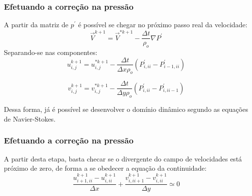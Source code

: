 \documentclass[xcolor=dvipsnames,10pt,aspectratio=169]{beamer}
\begin{document}
	\begin{frame}
		\frametitle{Efetuando a correção na pressão}
		A partir da matriz de $p^\prime$ é possível se chegar no próximo passo real da velocidade:
		\begin{equation}
			\vec{V}^{k+1}  = \vec{V}^{\ast{k + 1}} - \frac{\Delta t}{\rho_o} \nabla P^\prime
		\end{equation}
		Separando-se nas componentes:
		\begin{equation}
			u^{k+1}_{i, j}  = u^{\ast k+1}_{i, j} - \frac{\Delta t}{\Delta x \rho_o} \left(  P^{\prime}_{i , ii} -   P^{\prime}_{i - 1, ii}  \right)
		\end{equation}

		\begin{equation}
		v^{k+1}_{i, j}  = v^{\ast k+1}_{i, j} - \frac{\Delta t}{\Delta y \rho_o}  \left(  P^{\prime}_{i , ii} -   P^{\prime}_{i, ii-1}    \right)
		\end{equation}

		Dessa forma, já é possível se desenvolver o domínio dinâmico segundo as equações de Navier-Stokes.


	\end{frame}




	\begin{frame}
		\frametitle{Efetuando a correção na pressão}
		A partir desta etapa, basta checar se o divergente do campo de velocidades está próximo de zero, de forma a se obedecer a equação da continuidade:
		\begin{equation}
		\frac{u_{i + 1 , ii}^{k + 1} - u_{i, ii}^{k + 1} }{\Delta x} + \frac{v_{i , ii + 1}^{k + 1} - v_{i, ii}^{k + 1} }{\Delta y} \simeq 0
		\end{equation}

	\end{frame}
\end{document}
